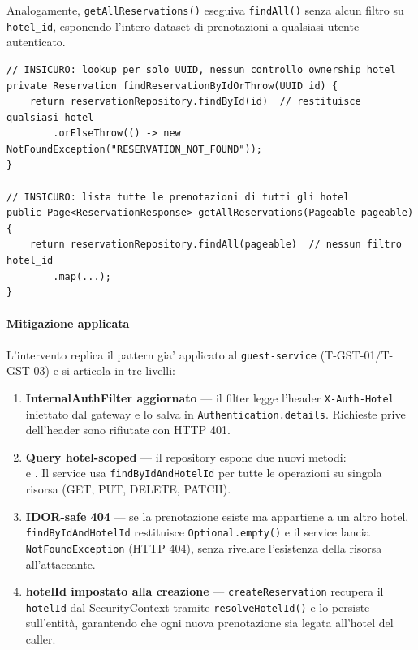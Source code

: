 ﻿\documentclass[a4paper,12pt]{report}
\begin{document}
Analogamente, \texttt{getAllReservations()} eseguiva \texttt{findAll()} senza
alcun filtro su \texttt{hotel\_id}, esponendo l'intero dataset di prenotazioni a
qualsiasi utente autenticato.

\begin{insecurebox}[title={Codice Vulnerabile --- ReservationServiceImpl.java (baseline)}]
\begin{lstlisting}[style=java]
// INSICURO: lookup per solo UUID, nessun controllo ownership hotel
private Reservation findReservationByIdOrThrow(UUID id) {
    return reservationRepository.findById(id)  // restituisce qualsiasi hotel
        .orElseThrow(() -> new NotFoundException("RESERVATION_NOT_FOUND"));
}

// INSICURO: lista tutte le prenotazioni di tutti gli hotel
public Page<ReservationResponse> getAllReservations(Pageable pageable) {
    return reservationRepository.findAll(pageable)  // nessun filtro hotel_id
        .map(...);
}
\end{lstlisting}
\end{insecurebox}

\paragraph{Mitigazione applicata}
L'intervento replica il pattern gia' applicato al \texttt{guest-service} (T-GST-01/T-GST-03)
e si articola in tre livelli:

\begin{enumerate}
    \item \textbf{InternalAuthFilter aggiornato} --- il filter legge l'header
          \texttt{X-Auth-Hotel} iniettato dal gateway e lo salva in
          \texttt{Authentication.details}. Richieste prive dell'header sono
          rifiutate con HTTP 401.
    \item \textbf{Query hotel-scoped} --- il repository espone due nuovi metodi:\\
          \texttt{} e
          \texttt{}. Il service usa
          \texttt{findByIdAndHotelId} per tutte le operazioni su singola
          risorsa (GET, PUT, DELETE, PATCH).
    \item \textbf{IDOR-safe 404} --- se la prenotazione esiste ma appartiene a
          un altro hotel, \texttt{findByIdAndHotelId} restituisce
          \texttt{Optional.empty()} e il service lancia \texttt{NotFoundException}
          (HTTP 404), senza rivelare l'esistenza della risorsa all'attaccante.
    \item \textbf{hotelId impostato alla creazione} --- \texttt{createReservation}
          recupera il \texttt{hotelId} dal SecurityContext tramite
          \texttt{resolveHotelId()} e lo persiste sull'entità, garantendo che
          ogni nuova prenotazione sia legata all'hotel del caller.
\end{enumerate}
\end{document}
